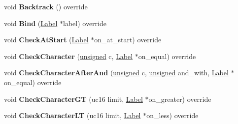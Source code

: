 \begin{DoxyCompactItemize}
void {\bfseries Backtrack} () override
\item 
\mbox{\label{classv8_1_1internal_1_1RegExpMacroAssemblerTracer_ae54ec6c8e120b8079f891e78724d6e32}} 
void {\bfseries Bind} (\mbox{\hyperlink{classv8_1_1internal_1_1Label}{Label}} $\ast$label) override
\item 
\mbox{\label{classv8_1_1internal_1_1RegExpMacroAssemblerTracer_a44a53103c2283c954f1550ff60f49712}} 
void {\bfseries Check\+At\+Start} (\mbox{\hyperlink{classv8_1_1internal_1_1Label}{Label}} $\ast$on\+\_\+at\+\_\+start) override
\item 
\mbox{\label{classv8_1_1internal_1_1RegExpMacroAssemblerTracer_ad1cd9a1e5b01d4272f689385eed9d95d}} 
void {\bfseries Check\+Character} (\mbox{\hyperlink{classunsigned}{unsigned}} c, \mbox{\hyperlink{classv8_1_1internal_1_1Label}{Label}} $\ast$on\+\_\+equal) override
\item 
\mbox{\label{classv8_1_1internal_1_1RegExpMacroAssemblerTracer_a1c7280abd8525d9bc9846174cee28b69}} 
void {\bfseries Check\+Character\+After\+And} (\mbox{\hyperlink{classunsigned}{unsigned}} c, \mbox{\hyperlink{classunsigned}{unsigned}} and\+\_\+with, \mbox{\hyperlink{classv8_1_1internal_1_1Label}{Label}} $\ast$on\+\_\+equal) override
\item 
\mbox{\label{classv8_1_1internal_1_1RegExpMacroAssemblerTracer_acd9510939768f9128ae583b993bc905c}} 
void {\bfseries Check\+Character\+GT} (uc16 limit, \mbox{\hyperlink{classv8_1_1internal_1_1Label}{Label}} $\ast$on\+\_\+greater) override
\item 
\mbox{\label{classv8_1_1internal_1_1RegExpMacroAssemblerTracer_a8d9af999c71f3c56f0824dc465187631}} 
void {\bfseries Check\+Character\+LT} (uc16 limit, \mbox{\hyperlink{classv8_1_1internal_1_1Label}{Label}} $\ast$on\+\_\+less) override
\item 
\mbox{\label{classv8_1_1internal_1_1RegExpMacroAssemblerTracer_ab99b7fc2e9ea57622f35482a3d3d7943}} 

\end{DoxyCompactItemize}
